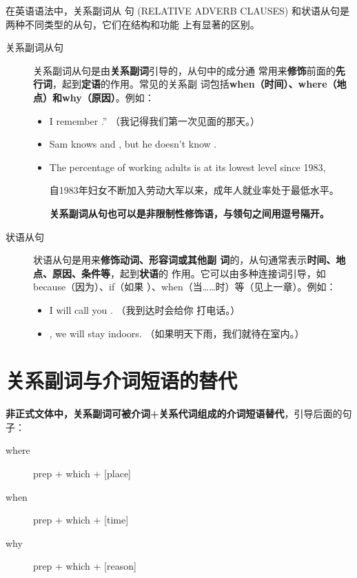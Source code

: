  在英语语法中，关系副词从
句 (RELATIVE ADVERB CLAUSES) 和状语从句是两种不同类型的从句，它们在结构和功能
上有显著的区别。
  \begin{description}
  \item[关系副词从句] 关系副词从句是由\textbf{关系副词}引导的，从句中的成分通
    常用来\textbf{修饰}前面的\textbf{先行词}，起到\textbf{定语}的作用。常见的关系副
    词包括\textbf{when（时间）、where（地点）和why（原因）}。例如：
    \begin{itemize}
    \item I remember  .” （我记得我们第一次见面的那天。）

    \item Sam knows   and
       , but he doesn't know
       .

    \item The percentage of working adults is at its lowest level since
      1983, 

      自1983年妇女不断加入劳动大军以来，成年人就业率处于最低水平。

      \textbf{关系副词从句也可以是非限制性修饰语，与领句之间用逗号隔开。}
    \end{itemize}

  \item[状语从句] 状语从句是用来\textbf{修饰}\textbf{动词、形容词或其他副
      词}的，从句通常表示\textbf{时间、地点、原因、条件等}，起到\textbf{状语}的
    作用。它可以由多种连接词引导，如because（因为）、if（如果
    ）、when（当……时）等（见上一章）。例如：
    \begin{itemize}
    \item I will call you . （我到达时会给你
      打电话。）
    \item {}, we will stay indoors. （如果明天下雨，我们就待在室内。）
    \end{itemize}
  \end{description}

\section{关系副词与介词短语的替代}

\textbf{非正式文体中，关系副词可被介词+关系代词组成的介词短语替代}，引导后面的句子：
\begin{description}
\item[where] prep + which + [place]
\item[when] prep + which + [time]
\item[why] prep + which + [reason]
\end{description}

